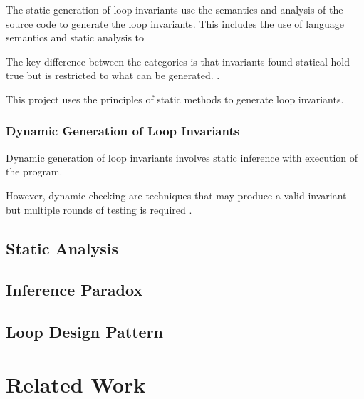 The static generation of loop invariants use the
semantics and analysis of the source code to generate the loop invariants.
This includes the use of language semantics and static analysis to 

The key difference between the categories is
that invariants found statical hold true
but is restricted to what can be generated.
\cite{benderfinding}\cite{Leino2005LoopIO}.

This project uses the principles of static methods to
generate loop invariants.

\subsubsection{Dynamic Generation of Loop Invariants}

Dynamic generation of loop invariants involves static inference
with execution of the program.


However, dynamic checking are techniques that may produce
a valid invariant but multiple rounds of testing is required
\cite{infer-dynamic} \cite{infer-postconditions}.

\subsection{Static Analysis}

\subsection{Inference Paradox}

\cite{infer-postconditions}

\subsection{Loop Design Pattern}

\cite{loop-patterns}
\cite{patterns}

\section{Related Work}

